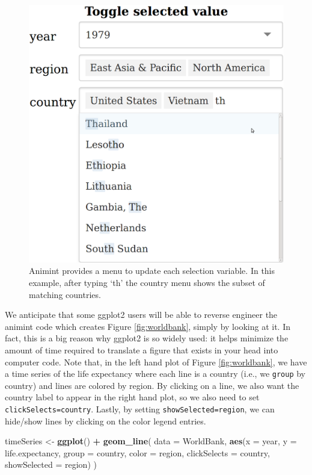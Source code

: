 \documentclass[12pt,]{article}
\newenvironment{Shaded}{\begin{snugshade}}{\end{snugshade}}
\newcommand{\KeywordTok}[1]{\textcolor[rgb]{0.13,0.29,0.53}{\textbf{#1}}}
\newcommand{\DataTypeTok}[1]{\textcolor[rgb]{0.13,0.29,0.53}{#1}}
\newcommand{\StringTok}[1]{\textcolor[rgb]{0.31,0.60,0.02}{#1}}
\newcommand{\OperatorTok}[1]{\textcolor[rgb]{0.81,0.36,0.00}{\textbf{#1}}}
\newcommand{\NormalTok}[1]{#1}
\theoremstyle{definition}
\theoremstyle{definition}
\theoremstyle{remark}
\begin{document}
\begin{figure}
\centering
\includegraphics{images/Screenshot-toggle-selected-value}
\caption{\label{fig:widgets}Animint provides a menu to update each selection
variable. In this example, after typing `th' the country menu shows the
subset of matching countries.}
\end{figure}

We anticipate that some ggplot2 users will be able to reverse engineer
the animint code which creates Figure \ref{fig:worldbank}, simply by
looking at it. In fact, this is a big reason why ggplot2 is so widely
used: it helps minimize the amount of time required to translate a
figure that exists in your head into computer code. Note that, in the
left hand plot of Figure \ref{fig:worldbank}, we have a time series of
the life expectancy where each line is a country (i.e., we
\texttt{group} by country) and lines are colored by region. By clicking
on a line, we also want the country label to appear in the right hand
plot, so we also need to set \texttt{clickSelects=country}. Lastly, by
setting \texttt{showSelected=region}, we can hide/show lines by clicking
on the color legend entries.

\begin{Shaded}
\begin{Highlighting}[]
\NormalTok{timeSeries <-}\StringTok{ }\KeywordTok{ggplot}\NormalTok{() }\OperatorTok{+}\StringTok{ }\KeywordTok{geom_line}\NormalTok{(}
  \DataTypeTok{data =}\NormalTok{ WorldBank,}
  \KeywordTok{aes}\NormalTok{(}\DataTypeTok{x =}\NormalTok{ year, }\DataTypeTok{y =}\NormalTok{ life.expectancy,}
      \DataTypeTok{group =}\NormalTok{ country, }\DataTypeTok{color =}\NormalTok{ region,}
      \DataTypeTok{clickSelects =}\NormalTok{ country, }
      \DataTypeTok{showSelected =}\NormalTok{ region)}
\NormalTok{)}
\end{Highlighting}
\end{Shaded}
\end{document}
